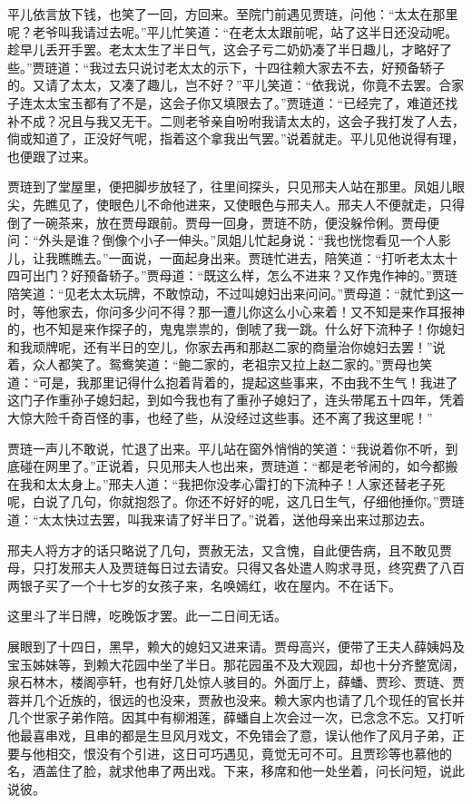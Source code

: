 平儿依言放下钱，也笑了一回，方回来。至院门前遇见贾琏，问他：``太太在那里呢？老爷叫我请过去呢。''平儿忙笑道：``在老太太跟前呢，站了这半日还没动呢。趁早儿丢开手罢。老太太生了半日气，这会子亏二奶奶凑了半日趣儿，才略好了些。''贾琏道：``我过去只说讨老太太的示下，十四往赖大家去不去，好预备轿子的。又请了太太，又凑了趣儿，岂不好？''平儿笑道：``依我说，你竟不去罢。合家子连太太宝玉都有了不是，这会子你又填限去了。''贾琏道：``已经完了，难道还找补不成？况且与我又无干。二则老爷亲自吩咐我请太太的，这会子我打发了人去，倘或知道了，正没好气呢，指着这个拿我出气罢。''说着就走。平儿见他说得有理，也便跟了过来。

贾琏到了堂屋里，便把脚步放轻了，往里间探头，只见邢夫人站在那里。凤姐儿眼尖，先瞧见了，使眼色儿不命他进来，又使眼色与邢夫人。邢夫人不便就走，只得倒了一碗茶来，放在贾母跟前。贾母一回身，贾琏不防，便没躲伶俐。贾母便问：``外头是谁？倒像个小子一伸头。''凤姐儿忙起身说：``我也恍惚看见一个人影儿，让我瞧瞧去。''一面说，一面起身出来。贾琏忙进去，陪笑道：``打听老太太十四可出门？好预备轿子。''贾母道：``既这么样，怎么不进来？又作鬼作神的。''贾琏陪笑道：``见老太太玩牌，不敢惊动，不过叫媳妇出来问问。''贾母道：``就忙到这一时，等他家去，你问多少问不得？那一遭儿你这么小心来着！又不知是来作耳报神的，也不知是来作探子的，鬼鬼祟祟的，倒唬了我一跳。什么好下流种子！你媳妇和我顽牌呢，还有半日的空儿，你家去再和那赵二家的商量治你媳妇去罢！''说着，众人都笑了。鸳鸯笑道：``鲍二家的，老祖宗又拉上赵二家的。''贾母也笑道：``可是，我那里记得什么抱着背着的，提起这些事来，不由我不生气！我进了这门子作重孙子媳妇起，到如今我也有了重孙子媳妇了，连头带尾五十四年，凭着大惊大险千奇百怪的事，也经了些，从没经过这些事。还不离了我这里呢！''

贾琏一声儿不敢说，忙退了出来。平儿站在窗外悄悄的笑道：``我说着你不听，到底碰在网里了。''正说着，只见邢夫人也出来，贾琏道：``都是老爷闹的，如今都搬在我和太太身上。''邢夫人道：``我把你没孝心雷打的下流种子！人家还替老子死呢，白说了几句，你就抱怨了。你还不好好的呢，这几日生气，仔细他捶你。''贾琏道：``太太快过去罢，叫我来请了好半日了。''说着，送他母亲出来过那边去。

邢夫人将方才的话只略说了几句，贾赦无法，又含愧，自此便告病，且不敢见贾母，只打发邢夫人及贾琏每日过去请安。只得又各处遣人购求寻觅，终究费了八百两银子买了一个十七岁的女孩子来，名唤嫣红，收在屋内。不在话下。

这里斗了半日牌，吃晚饭才罢。此一二日间无话。

展眼到了十四日，黑早，赖大的媳妇又进来请。贾母高兴，便带了王夫人薛姨妈及宝玉姊妹等，到赖大花园中坐了半日。那花园虽不及大观园，却也十分齐整宽阔，泉石林木，楼阁亭轩，也有好几处惊人骇目的。外面厅上，薛蟠、贾珍、贾琏、贾蓉并几个近族的，很远的也没来，贾赦也没来。赖大家内也请了几个现任的官长并几个世家子弟作陪。因其中有柳湘莲，薛蟠自上次会过一次，已念念不忘。又打听他最喜串戏，且串的都是生旦风月戏文，不免错会了意，误认他作了风月子弟，正要与他相交，恨没有个引进，这日可巧遇见，竟觉无可不可。且贾珍等也慕他的名，酒盖住了脸，就求他串了两出戏。下来，移席和他一处坐着，问长问短，说此说彼。

